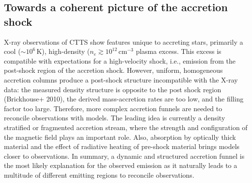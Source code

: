 \subsection{Towards a coherent picture of the accretion shock}
X-ray observations of CTTS show features unique to accreting stars, primarily a cool ($\sim10^6\,$K), high-density ($n_e\gtrsim10^{12}\,$cm$^{-3}$ plasma excess. This excess is compatible with expectations for a high-velocity shock, i.e., emission from the post-shock region of the accretion shock. However, uniform, homogeneous accretion columns produce a post-shock structure incompatible with the X-ray data: the measured density structure is opposite to the post shock region (Brickhouse+ 2010), the derived mass-accretion rates are too low, and the filling factor too large. Therefore, more complex accretion funnels are needed to reconcile observations with models. The leading idea is currently a density stratified or fragmented accretion stream, where the strength and configuration of the magnetic field plays an important role. Also, absorption by optically thick material and the effect of radiative heating of pre-shock material brings models closer to observations. In summary, a dynamic and structured accretion funnel is the most likely explanation for the observed emission as it naturally leads to a multitude of different emitting regions to reconcile observations.
